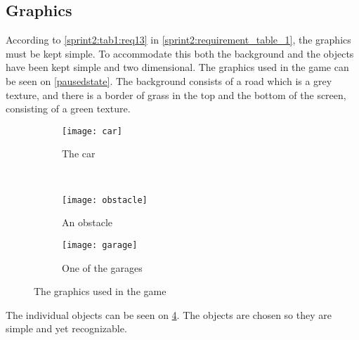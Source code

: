 \subsection{Graphics}\label{sprint2:graphics}
According to \cref{sprint2:tab1:req13} in \cref{sprint2:requirement_table_1}, the graphics must be kept simple.
To accommodate this both the background and the objects have been kept simple and two dimensional.
The graphics used in the game can be seen on \cref{pausedstate}.
The background consists of a road which is a grey texture, and there is a border of grass in the top and the bottom of the screen, consisting of a green texture.

\begin{figure}[h]
\begin{subfigure}{0.5\textwidth}
\centering
\texttt{[image: car]}
\caption{The car}
\label{car}
\end{subfigure}
~
\begin{subfigure}{0.5\textwidth}
\centering
\texttt{[image: obstacle]}
\caption{An obstacle}
\label{obstacle}
\end{subfigure}

\begin{subfigure}{\textwidth}
\centering
\texttt{[image: garage]}
\caption{One of the garages}
\label{garage}
\end{subfigure}
\caption{The graphics used in the game}
\label{graphicszoom}
\end{figure}

The individual objects can be seen on \cref{graphicszoom}.
The objects are chosen so they are simple and yet recognizable.